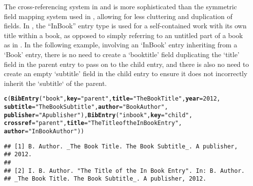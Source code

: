 \documentclass[article]{jss}\usepackage[]{graphicx}\usepackage[]{color}
\makeatletter
\newcommand{\hlnum}[1]{\textcolor[rgb]{0.125,0.125,1}{#1}}%
\newcommand{\hlstr}[1]{\textcolor[rgb]{0.125,0.125,1}{#1}}%
\newcommand{\hlstd}[1]{\textcolor[rgb]{0.251,0.251,0.282}{#1}}%
\newcommand{\hlkwc}[1]{\textcolor[rgb]{0.529,0,0.184}{\textbf{#1}}}%
\newcommand{\hlkwd}[1]{\textcolor[rgb]{0.251,0.251,0.282}{\textbf{#1}}}%
\newenvironment{kframe}{%
 \def\at@end@of@kframe{}%
 \ifinner\ifhmode%
  \def\at@end@of@kframe{\end{minipage}}%
  \begin{minipage}{\columnwidth}%
 \fi\fi%
 \def\FrameCommand##1{\hskip\@totalleftmargin \hskip-\fboxsep
 \colorbox{shadecolor}{##1}\hskip-\fboxsep
     \hskip-\linewidth \hskip-\@totalleftmargin \hskip\columnwidth}%
 \MakeFramed {\advance\hsize-\width
   \@totalleftmargin\z@ \linewidth\hsize
   \@setminipage}}%
 {\par\unskip\endMakeFramed%
 \at@end@of@kframe}
\newenvironment{knitrout}{}{} %
\newcommand{\ourpkg}{\pkg{RefManageR}}
\makeatother
\begin{document}
The cross-referencing system in \Biblatex{} and \ourpkg{} is more sophisticated than the symmetric field mapping system used in \Bibtex{}, allowing for less cluttering and duplication of fields.  In \Biblatex{}, the ``InBook'' entry type is used for a self-contained work with its own title within a book, as opposed to simply referring to an untitled part of a book as in \Bibtex{}. In the following example, involving an `InBook' entry inheriting from a `Book' entry, there is no need to create a `booktitle' field duplicating the `title' field in the parent entry to pass on to the child entry, and there is also no need to create an empty `subtitle' field in the child entry to ensure it does not incorrectly inherit the `subtitle` of the parent.  
\begin{knitrout}
\color{fgcolor}\begin{kframe}
\begin{alltt}
\hlkwd{c}\hlstd{(}\hlkwd{BibEntry}\hlstd{(}\hlstr{"book"}\hlstd{,} \hlkwc{key} \hlstd{=} \hlstr{"parent"}\hlstd{,} \hlkwc{title} \hlstd{=} \hlstr{"The Book Title"}\hlstd{,} \hlkwc{year} \hlstd{=} \hlnum{2012}\hlstd{,}
           \hlkwc{subtitle} \hlstd{=} \hlstr{"The Book Subtitle"}\hlstd{,} \hlkwc{author} \hlstd{=} \hlstr{"Book Author"}\hlstd{,}
           \hlkwc{publisher} \hlstd{=} \hlstr{"A publisher"}\hlstd{),} \hlkwd{BibEntry}\hlstd{(}\hlstr{"inbook"}\hlstd{,} \hlkwc{key} \hlstd{=} \hlstr{"child"}\hlstd{,}
           \hlkwc{crossref} \hlstd{=} \hlstr{"parent"}\hlstd{,} \hlkwc{title} \hlstd{=} \hlstr{"The Title of the In Book Entry"}\hlstd{,}
           \hlkwc{author} \hlstd{=} \hlstr{"In Book Author"}\hlstd{))}
\end{alltt}
\begin{verbatim}
## [1] B. Author. _The Book Title. The Book Subtitle_. A publisher,
## 2012.
## 
## [2] I. B. Author. "The Title of the In Book Entry". In: B. Author.
## _The Book Title. The Book Subtitle_. A publisher, 2012.
\end{verbatim}
\end{kframe}
\end{knitrout}
\end{document}
